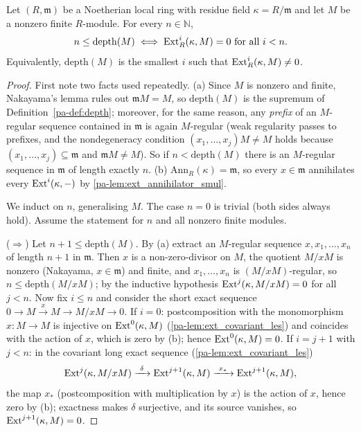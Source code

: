 \begin{theorem}
  \label{pa-thm:depth_ext}
  \leanok

  Let \((R, \mathfrak m)\) be a Noetherian local ring with residue field
  \(\kappa = R/\mathfrak m\) and let \(M\) be a nonzero finite \(R\)-module. For every
  \(n \in \mathbb{N}\),
  \[
    n \leq \mathrm{depth}(M)
    \iff
    \operatorname{Ext}^i_R(\kappa, M) = 0 \text{ for all } i < n.
  \]
  Equivalently, \(\mathrm{depth}(M)\) is the smallest \(i\) such that
  \(\operatorname{Ext}^i_R(\kappa, M) \neq 0\).
\end{theorem}
\begin{proof}
  \leanok
  First note two facts used repeatedly. (a) Since \(M\) is nonzero and finite,
  Nakayama's lemma rules out \(\mathfrak m M = M\), so \(\mathrm{depth}(M)\) is the
  supremum of Definition~\ref{pa-def:depth}; moreover, for the same reason, any
  \emph{prefix} of an \(M\)-regular sequence contained in \(\mathfrak m\) is again
  \(M\)-regular (weak regularity passes to prefixes, and the nondegeneracy condition
  \((x_1,\dots,x_j)M \neq M\) holds because \((x_1,\dots,x_j) \subseteq \mathfrak m\) and
  \(\mathfrak m M \neq M\)). So if \(n < \mathrm{depth}(M)\) there is an \(M\)-regular
  sequence in \(\mathfrak m\) of length exactly \(n\). (b) \(\mathrm{Ann}_R(\kappa) =
  \mathfrak m\), so every \(x \in \mathfrak m\) annihilates every \(\operatorname{Ext}^i(\kappa, -)\)
  by \ref{pa-lem:ext_annihilator_smul}.

  We induct on \(n\), generalising \(M\). The case \(n = 0\) is trivial (both sides
  always hold). Assume the statement for \(n\) and all nonzero finite modules.

  (\(\Rightarrow\)) Let \(n + 1 \leq \mathrm{depth}(M)\). By (a) extract an
  \(M\)-regular sequence \(x, x_1, \dots, x_n\) of length \(n+1\) in \(\mathfrak m\).
  Then \(x\) is a non-zero-divisor on \(M\), the quotient \(M/xM\) is nonzero (Nakayama,
  \(x \in \mathfrak m\)) and finite, and \(x_1, \dots, x_n\) is \((M/xM)\)-regular, so
  \(n \leq \mathrm{depth}(M/xM)\); by the inductive hypothesis
  \(\operatorname{Ext}^j(\kappa, M/xM) = 0\) for all \(j < n\). Now fix \(i \leq n\) and consider the
  short exact sequence \(0 \to M \xrightarrow{x} M \to M/xM \to 0\). If \(i = 0\):
  postcomposition with the monomorphism \(x : M \to M\) is injective on
  \(\operatorname{Ext}^0(\kappa, M)\) (\ref{pa-lem:ext_covariant_les}) and coincides with the action of
  \(x\), which is zero by (b); hence \(\operatorname{Ext}^0(\kappa, M) = 0\). If \(i = j + 1\) with
  \(j < n\): in the covariant long exact sequence (\ref{pa-lem:ext_covariant_les})
  \[
    \Ext^{j}(\kappa, M/xM) \xrightarrow{\ \delta\ } \Ext^{j+1}(\kappa, M)
      \xrightarrow{\ x_*\ } \Ext^{j+1}(\kappa, M),
  \]
  the map \(x_*\) (postcomposition with multiplication by \(x\)) is the action of \(x\),
  hence zero by (b); exactness makes \(\delta\) surjective, and its source vanishes, so
  \(\operatorname{Ext}^{j+1}(\kappa, M) = 0\).


\end{proof}
